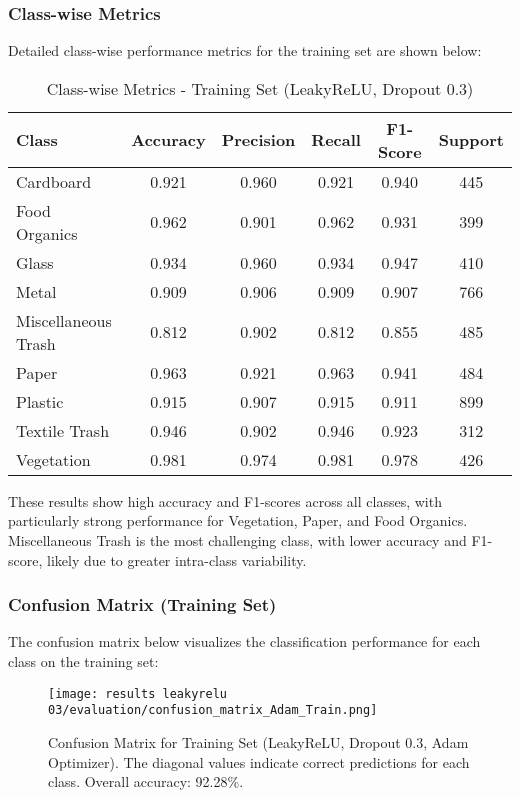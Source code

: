 \documentclass[12pt,a4paper]{article}
\begin{document}
\subsubsection{Class-wise Metrics}

Detailed class-wise performance metrics for the training set are shown below:

\begin{table}[H]
\centering
\caption{Class-wise Metrics - Training Set (LeakyReLU, Dropout 0.3)}
\begin{tabular}{lccccc}
\toprule
\textbf{Class} & \textbf{Accuracy} & \textbf{Precision} & \textbf{Recall} & \textbf{F1-Score} & \textbf{Support} \\
\midrule
Cardboard & 0.921 & 0.960 & 0.921 & 0.940 & 445 \\
Food Organics & 0.962 & 0.901 & 0.962 & 0.931 & 399 \\
Glass & 0.934 & 0.960 & 0.934 & 0.947 & 410 \\
Metal & 0.909 & 0.906 & 0.909 & 0.907 & 766 \\
Miscellaneous Trash & 0.812 & 0.902 & 0.812 & 0.855 & 485 \\
Paper & 0.963 & 0.921 & 0.963 & 0.941 & 484 \\
Plastic & 0.915 & 0.907 & 0.915 & 0.911 & 899 \\
Textile Trash & 0.946 & 0.902 & 0.946 & 0.923 & 312 \\
Vegetation & 0.981 & 0.974 & 0.981 & 0.978 & 426 \\
\bottomrule
\end{tabular}
\end{table}

These results show high accuracy and F1-scores across all classes, with particularly strong performance for Vegetation, Paper, and Food Organics. Miscellaneous Trash is the most challenging class, with lower accuracy and F1-score, likely due to greater intra-class variability.

\subsubsection{Confusion Matrix (Training Set)}

The confusion matrix below visualizes the classification performance for each class on the training set:

\begin{figure}[H]
\centering
\texttt{[image: results leakyrelu 03/evaluation/confusion\_matrix\_Adam\_Train.png]}
\caption{Confusion Matrix for Training Set (LeakyReLU, Dropout 0.3, Adam Optimizer). The diagonal values indicate correct predictions for each class. Overall accuracy: 92.28\%.}
\label{fig:confmat_train}
\end{figure}
\end{document}
